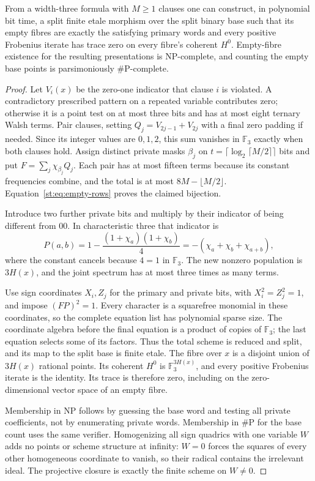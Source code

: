\begin{theorem}
\label{st:empty-hard}
From a width-three formula with $M\ge1$ clauses one can construct, in polynomial bit time, a split finite etale morphism over the split binary base such that its empty fibres are exactly the satisfying primary words and every positive Frobenius iterate has trace zero on every fibre's coherent $H^0$. Empty-fibre existence for the resulting presentations is NP-complete, and counting the empty base points is parsimoniously $\#\mathrm P$-complete.
\end{theorem}
\begin{proof}
Let $V_i(x)$ be the zero-one indicator that clause $i$ is violated. A contradictory prescribed pattern on a repeated variable contributes zero; otherwise it is a point test on at most three bits and has at most eight ternary Walsh terms. Pair clauses, setting $Q_j=V_{2j-1}+V_{2j}$ with a final zero padding if needed. Since its integer values are $0,1,2$, this sum vanishes in $\mathbb F_3$ exactly when both clauses hold. Assign distinct private masks $\beta_j$ on
$t=\lceil\log_2\lceil M/2\rceil\rceil$ bits and put $F=\sum_j\chi_{\beta_j}Q_j$. Each pair has at most fifteen terms because its constant frequencies combine, and the total is at most $8M-\lfloor M/2\rfloor$. Equation~\eqref{st:eq:empty-rows} proves the claimed bijection.

Introduce two further private bits and multiply by their indicator of being different from $00$. In characteristic three that indicator is
\[
 P(a,b)=1-\frac{(1+\chi_a)(1+\chi_b)}4
       =-(\chi_a+\chi_b+\chi_{a+b}),
\]
where the constant cancels because $4=1$ in $\mathbb F_3$. The new nonzero population is $3H(x)$, and the joint spectrum has at most three times as many terms.

Use sign coordinates $X_i,Z_j$ for the primary and private bits, with $X_i^2=Z_j^2=1$, and impose $(FP)^2=1$. Every character is a squarefree monomial in these coordinates, so the complete equation list has polynomial sparse size. The coordinate algebra before the final equation is a product of copies of $\mathbb F_3$; the last equation selects some of its factors. Thus the total scheme is reduced and split, and its map to the split base is finite etale. The fibre over $x$ is a disjoint union of $3H(x)$ rational points. Its coherent $H^0$ is $\mathbb F_3^{3H(x)}$, and every positive Frobenius iterate is the identity. Its trace is therefore zero, including on the zero-dimensional vector space of an empty fibre.

Membership in NP follows by guessing the base word and testing all private coefficients, not by enumerating private words. Membership in $\#\mathrm P$ for the base count uses the same verifier. Homogenizing all sign quadrics with one variable $W$ adds no points or scheme structure at infinity: $W=0$ forces the squares of every other homogeneous coordinate to vanish, so their radical contains the irrelevant ideal. The projective closure is exactly the finite scheme on $W\ne0$.
\end{proof}
